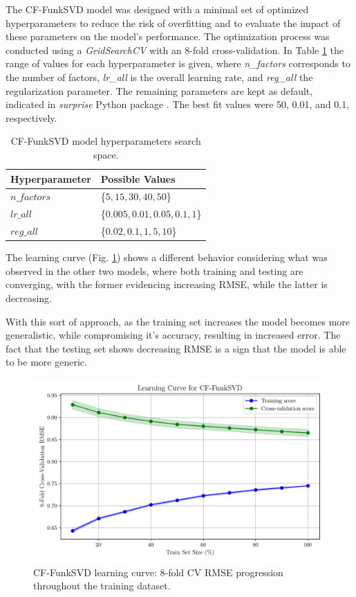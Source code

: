 \documentclass[conference]{IEEEtran}
\begin{document}
The CF-FunkSVD model was designed with a minimal set of optimized hyperparameters to reduce the risk of overfitting and to evaluate the impact of these parameters on the model's performance. The optimization process was conducted using a \textit{GridSearchCV} with an 8-fold cross-validation. In Table \ref{parametrosSVD} the range of values for each hyperparameter is given, where \textit{n\_factors} corresponds to the number of factors, \textit{lr\_all} is the overall learning rate, and \textit{reg\_all} the regularization parameter. The remaining parameters are kept as default, indicated in \textit{surprise} Python package \cite{surprise}. The best fit values were 50, 0.01, and 0.1, respectively.

\begin{table}[H]
\centering
\caption{CF-FunkSVD model hyperparameters search space.}
\label{parametrosSVD}
\begin{tabular}{ll}
\toprule
\textbf{Hyperparameter} & \textbf{Possible Values} \\
\midrule
$n\_factors$ & \{$5,15,30,40,50$\} \\ 
$lr\_all$ & \{$0.005, 0.01, 0.05, 0.1, 1$\} \\ 
$reg\_all$ & \{$0.02,0.1,1,5,10$\} \\ 
\bottomrule
\end{tabular}
\end{table}

The learning curve (Fig. \ref{fig:model03_learningcurve}) shows a different behavior considering what was observed in the other two models, where both training and testing are converging, with the former evidencing increasing RMSE, while the latter is decreasing.

With this sort of approach, as the training set increases the model becomes more generalistic, while compromising it's accuracy, resulting in increased error. The fact that the testing set shows decreasing RMSE is a sign that the model is able to be more generic.

\begin{figure}[H]
    \centering
    \includegraphics[width=1\linewidth]{assets/model03_learningcurve.png}
    \caption{CF-FunkSVD learning curve: 8-fold CV RMSE progression throughout the training dataset.}
    \label{fig:model03_learningcurve}
\end{figure}
\end{document}
